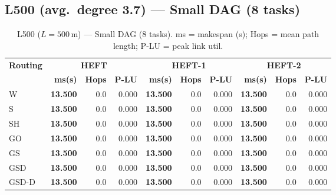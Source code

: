 \documentclass[11pt]{article}
\newcommand{\win}[1]{\textcolor{green!50!black}{\textbf{#1}}}
\begin{document}
\subsection{L500 (avg.\ degree 3.7) --- Small DAG (8 tasks)}
\begin{table}[H]
\centering\small
\begin{tabular}{l r r r r r r r r r}
\toprule
\textbf{Routing} & \multicolumn{3}{c}{\textbf{HEFT}} & \multicolumn{3}{c}{\textbf{HEFT-1}} & \multicolumn{3}{c}{\textbf{HEFT-2}} \\
\cmidrule(lr){2-4}\cmidrule(lr){5-7}\cmidrule(lr){8-10}
& \textbf{ms(s)} & \textbf{Hops} & \textbf{P-LU} & \textbf{ms(s)} & \textbf{Hops} & \textbf{P-LU} & \textbf{ms(s)} & \textbf{Hops} & \textbf{P-LU} \\
\midrule
  W & \win{13.500} & 0.0 & 0.000 & \win{13.500} & 0.0 & 0.000 & \win{13.500} & 0.0 & 0.000 \\
  S & \win{13.500} & 0.0 & 0.000 & \win{13.500} & 0.0 & 0.000 & \win{13.500} & 0.0 & 0.000 \\
  SH & \win{13.500} & 0.0 & 0.000 & \win{13.500} & 0.0 & 0.000 & \win{13.500} & 0.0 & 0.000 \\
  GO & \win{13.500} & 0.0 & 0.000 & \win{13.500} & 0.0 & 0.000 & \win{13.500} & 0.0 & 0.000 \\
  GS & \win{13.500} & 0.0 & 0.000 & \win{13.500} & 0.0 & 0.000 & \win{13.500} & 0.0 & 0.000 \\
  GSD & \win{13.500} & 0.0 & 0.000 & \win{13.500} & 0.0 & 0.000 & \win{13.500} & 0.0 & 0.000 \\
  GSD-D & \win{13.500} & 0.0 & 0.000 & \win{13.500} & 0.0 & 0.000 & \win{13.500} & 0.0 & 0.000 \\
\bottomrule
\end{tabular}
\caption{L500 ($L=500$\,m) --- Small DAG (8 tasks). ms = makespan (s); Hops = mean path length; P-LU = peak link util.}
\end{table}
\end{document}
